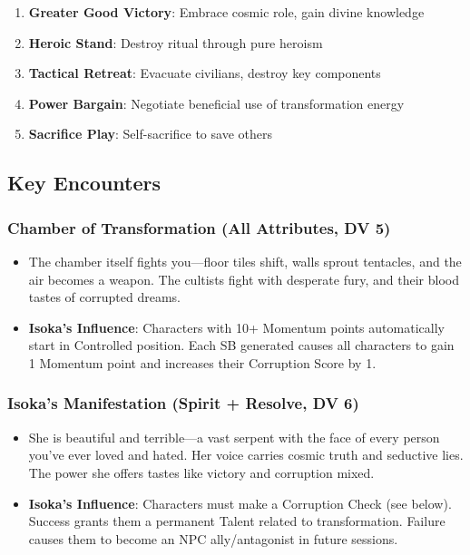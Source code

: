 \documentclass[11pt]{article}
\begin{document}
\begin{enumerate}[leftmargin=*]
    \item \textbf{Greater Good Victory}: Embrace cosmic role, gain divine knowledge
    \item \textbf{Heroic Stand}: Destroy ritual through pure heroism
    \item \textbf{Tactical Retreat}: Evacuate civilians, destroy key components
    \item \textbf{Power Bargain}: Negotiate beneficial use of transformation energy
    \item \textbf{Sacrifice Play}: Self-sacrifice to save others
\end{enumerate}

\subsection{Key Encounters}

\subsubsection{Chamber of Transformation (All Attributes, DV 5)}
\begin{itemize}[leftmargin=*]
    \item The chamber itself fights you—floor tiles shift, walls sprout tentacles, and the air becomes a weapon. The cultists fight with desperate fury, and their blood tastes of corrupted dreams.
    \item \textbf{Isoka's Influence}: Characters with 10+ Momentum points automatically start in Controlled position. Each SB generated causes all characters to gain 1 Momentum point and increases their Corruption Score by 1.
\end{itemize}

\subsubsection{Isoka's Manifestation (Spirit + Resolve, DV 6)}
\begin{itemize}[leftmargin=*]
    \item She is beautiful and terrible—a vast serpent with the face of every person you've ever loved and hated. Her voice carries cosmic truth and seductive lies. The power she offers tastes like victory and corruption mixed.
    \item \textbf{Isoka's Influence}: Characters must make a Corruption Check (see below). Success grants them a permanent Talent related to transformation. Failure causes them to become an NPC ally/antagonist in future sessions.
\end{itemize}
\end{document}
